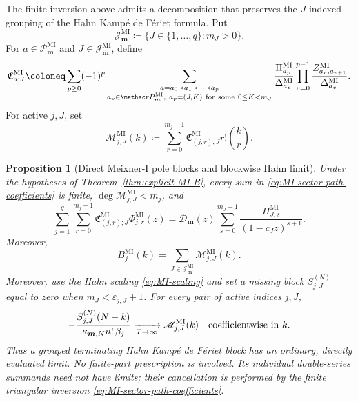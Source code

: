 \documentclass[10pt]{amsart}
\newcommand{\mm}{\boldsymbol m}
\theoremstyle{plain}
\newtheorem{proposition}[theorem]{Proposition}
\theoremstyle{definition}
\theoremstyle{remark}
\begin{document}
The finite inversion above admits a decomposition that preserves the
\(J\)-indexed grouping of the Hahn Kamp\'e de F\'eriet formula. Put
\[
 \mathcal J_{\mm}^{\mathrm{MI}}
 \coloneq\{J\in\{1,\ldots,q\}:m_J>0\}.
\]
For \(a\in\mathscr P_{\boldsymbol m}^{\mathrm{MI}}\) and
\(J\in\mathcal J_{\mm}^{\mathrm{MI}}\), define
\begin{equation}
 \mathfrak C_{a;J}^{\mathrm{MI}}
 \coloneq
 \sum_{p\ge0}(-1)^p
 \sum_{\substack{a=a_0\prec a_1\prec\cdots\prec a_p\\
                  a_v\in\mathscr P_{\boldsymbol m}^{\mathrm{MI}},\
                  a_p=(J,K)\ {\rm for\ some}\ 0\le K<m_J}}
 \frac{\Pi_{a_p}^{\mathrm{MI}}}
      {\Delta_{a_p}^{\mathrm{MI}}}
 \prod_{v=0}^{p-1}
 \frac{Z_{a_v,a_{v+1}}^{\mathrm{MI}}}
      {\Delta_{a_v}^{\mathrm{MI}}}.
 \label{eq:MI-sector-path-coefficients}
\end{equation}
For active \(j,J\), set
\begin{equation}
 \mathscr M_{j,J}^{\mathrm{MI}}(k)
 \coloneq\sum_{r=0}^{m_j-1}
 \mathfrak C_{(j,r);J}^{\mathrm{MI}}r!\binom{k}{r}.
 \label{eq:MI-direct-sector-block}
\end{equation}

\begin{proposition}[Direct Meixner-I pole blocks and blockwise Hahn limit]
\label{prop:MI-sector-blocks}
Under the hypotheses of Theorem~\ref{thm:explicit-MI-B}, every sum in
\eqref{eq:MI-sector-path-coefficients} is finite,
\(\deg\mathscr M_{j,J}^{\mathrm{MI}}<m_j\), and
\begin{equation}
 \sum_{j=1}^q\sum_{r=0}^{m_j-1}
 \mathfrak C_{(j,r);J}^{\mathrm{MI}}
 \Phi_{j,r}^{\mathrm{MI}}(z)
 =\mathcal D_{\boldsymbol m}(z)
 \sum_{s=0}^{m_J-1}
 \frac{\Pi_{J,s}^{\mathrm{MI}}}{(1-c_Jz)^{s+1}}.
 \label{eq:MI-direct-sector-identity}
\end{equation}
Moreover,
\begin{equation}
 B_j^{\mathrm{MI}}(k)
 =\sum_{J\in\mathcal J_{\mm}^{\mathrm{MI}}}
 \mathscr M_{j,J}^{\mathrm{MI}}(k).
 \label{eq:MI-direct-sector-decomposition}
\end{equation}
Moreover, use the Hahn scaling \eqref{eq:MI-scaling} and set a missing
block \(S_{j,J}^{(N)}\) equal to zero when
\(m_J<\varepsilon_{j,J}+1\). For every pair of active indices \(j,J\),
\begin{equation}
 -\frac{S_{j,J}^{(N)}(N-k)}
 {\kappa_{\mm,N}n!\,\beta_j}
 \xrightarrow[T\to\infty]{}
 \mathscr M_{j,J}^{\mathrm{MI}}(k)
 \quad\hbox{coefficientwise in }k.
 \label{eq:Hahn-MI-blockwise-limit}
\end{equation}
Thus a grouped terminating Hahn Kamp\'e de F\'eriet block has an
ordinary, directly evaluated limit. No finite-part prescription is
involved. Its individual double-series summands need not have limits;
their cancellation is performed by the finite triangular inversion
\eqref{eq:MI-sector-path-coefficients}.
\end{proposition}
\end{document}

